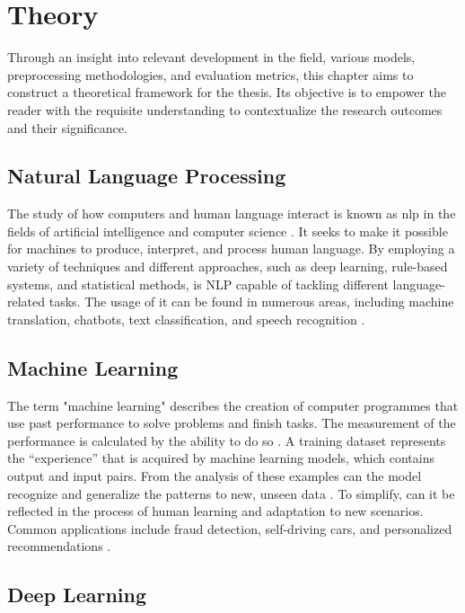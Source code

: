 \chapter{Theory}

Through an insight into relevant development in the field, various models, preprocessing methodologies, and evaluation metrics, this chapter aims to construct a theoretical framework for the thesis. Its objective is to empower the reader with the requisite understanding to contextualize the research outcomes and their significance.

\section{Natural Language Processing}

The study of how computers and human language interact is known as \acf{nlp} in the fields of artificial intelligence and computer science \citep{helland_tackling_2023}. It seeks to make it possible for machines to produce, interpret, and process human language. By employing a variety of techniques and different approaches, such as deep learning, rule-based systems, and statistical methods, is NLP capable of tackling different language-related tasks. The usage of it can be found in numerous areas, including machine translation, chatbots, text classification, and speech recognition \citep{helland_tackling_2023}.

\section{Machine Learning}

The term "machine learning" describes the creation of computer programmes that use past performance to solve problems and finish tasks. The measurement of the performance is calculated by the ability to do so \citep{helland_tackling_2023}. A training dataset represents the “experience” that is acquired by machine learning models, which contains output and input pairs. From the analysis of these examples can the model recognize and generalize the patterns to new, unseen data \citep{helland_tackling_2023}. To simplify, can it be reflected in the process of human learning and adaptation to new scenarios. Common applications include fraud detection, self-driving cars, and personalized recommendations \citep{helland_tackling_2023}.

\section{Deep Learning}

